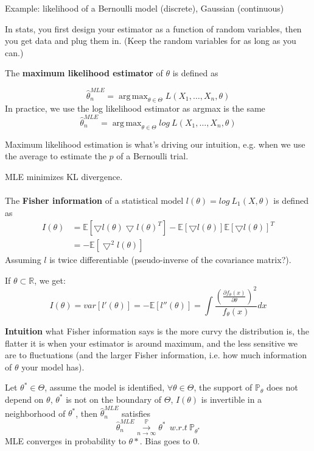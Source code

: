 \documentclass{article}
\DeclareMathOperator*{\argmax}{arg\,max}
\begin{document}
Example: likelihood of a Bernoulli model (discrete), Gaussian (continuous)

In stats, you first design your estimator as a function of random variables, then you get data and plug them in.
(Keep the random variables for as long as you can.)

The \textbf{maximum likelihood estimator} of $\theta$ is defined as

$$
\hat{\theta}^{MLE}_n = \argmax_{\theta \in \Theta} L(X_1, \dots, X_n, \theta)
$$
In practice, we use the log likelihood estimator as argmax is the same
$$
\hat{\theta}^{MLE}_n = \argmax_{\theta \in \Theta} log ~ L(X_1, \dots, X_n, \theta)
$$

Maximum likelihood estimation is what's driving our intuition, e.g. when we use the average to estimate the $p$ of a Bernoulli trial.

MLE minimizes KL divergence.
\\
\\
The \textbf{Fisher information} of a statistical model $l(\theta) = log ~ L_1(X, \theta)$ is defined as
\begin{align*}
I(\theta) &= \mathbb{E}[\bigtriangledown l(\theta) \bigtriangledown l(\theta)^T] - \mathbb{E}[\bigtriangledown l(\theta)] \mathbb{E}[\bigtriangledown l(\theta)]^T \\
          &= - \mathbb{E}[\bigtriangledown^2 l(\theta)]
\end{align*}
Assuming $l$ is twice differentiable (pseudo-inverse of the covariance matrix?).

If $\theta \subset \mathbb{R}$, we get:
$$
I(\theta) = var[l'(\theta)] = - \mathbb{E}[l''(\theta)] = \int \frac{(\frac{\partial{f_{\theta}(x)}}{\partial \theta})^2}{f_{\theta}(x)} dx
$$

\textbf{Intuition} what Fisher information says is the more curvy the distribution is, the flatter it is when your estimator is around maximum, and the less sensitive we are to fluctuations (and the larger Fisher information, i.e. how much information of $\theta$ your model has).

Let $\theta^* \in \Theta$, assume the model is identified, $\forall \theta \in \Theta$, the support of $\mathbb{P}_{\theta}$ does not depend on $\theta$, $\theta^*$ is not on the boundary of $\Theta$, $I(\theta)$ is invertible in a neighborhood of $\theta^*$, then
$\hat{\theta}^{MLE}_{n}$ satisfies
$$
\hat{\theta}^{MLE}_{n} \overset{\mathbb{P}}{\underset{n \to \infty}{\longrightarrow}} \theta^* ~ ~ w.r.t ~ \mathbb{P}_{\theta^*}
$$
MLE converges in probability to $\theta*$. Bias goes to 0.
\end{document}
